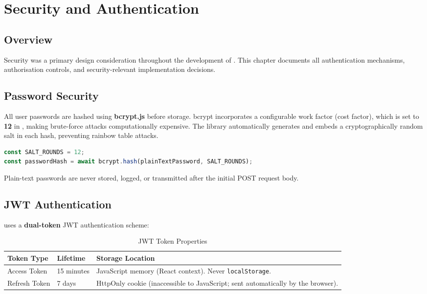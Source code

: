 \chapter{Security and Authentication}

\section{Overview}

Security was a primary design consideration throughout the development of \projectname{}. This chapter documents all authentication mechanisms, authorisation controls, and security-relevant implementation decisions.

\section{Password Security}

All user passwords are hashed using \textbf{bcrypt.js} \cite{bcryptjs} before storage. bcrypt incorporates a configurable work factor (cost factor), which is set to \textbf{12} in \projectname{}, making brute-force attacks computationally expensive. The library automatically generates and embeds a cryptographically random salt in each hash, preventing rainbow table attacks.

\begin{lstlisting}[language=TypeScript, caption={Password Hashing During Signup}]
const SALT_ROUNDS = 12;
const passwordHash = await bcrypt.hash(plainTextPassword, SALT_ROUNDS);
\end{lstlisting}

Plain-text passwords are never stored, logged, or transmitted after the initial POST request body.

\section{JWT Authentication}

\projectname{} uses a \textbf{dual-token} JWT authentication scheme:

\begin{table}[H]
\centering
\caption{JWT Token Properties}
\begin{tabularx}{\textwidth}{llX}
\toprule
\textbf{Token Type} & \textbf{Lifetime} & \textbf{Storage Location} \\
\midrule
Access Token  & 15 minutes & JavaScript memory (React context). Never \texttt{localStorage}. \\
Refresh Token & 7 days     & HttpOnly cookie (inaccessible to JavaScript; sent automatically by the browser). \\
\bottomrule
\end{tabularx}
\end{table}

